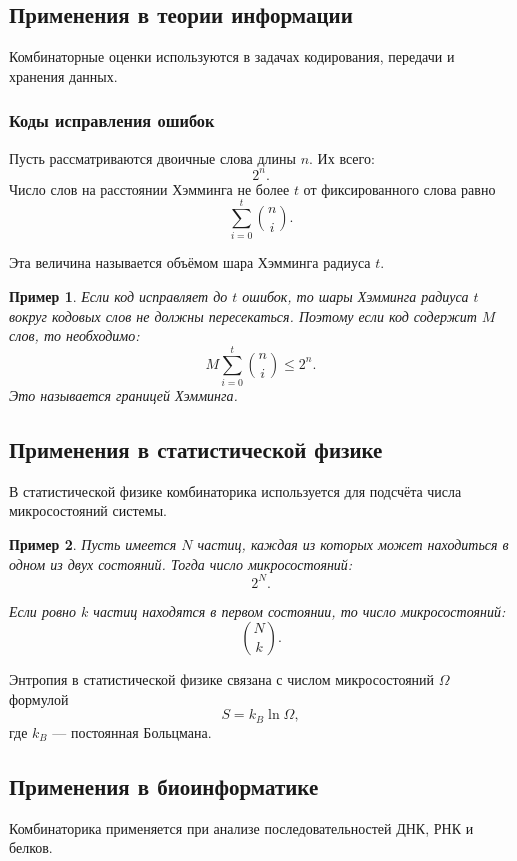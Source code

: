 \documentclass[12pt,a4paper]{article}
\newtheorem{example}{Пример}
\begin{document}
\subsection{Применения в теории информации}

Комбинаторные оценки используются в задачах кодирования, передачи и хранения данных.

\subsubsection{Коды исправления ошибок}

Пусть рассматриваются двоичные слова длины $n$. Их всего:
\[
2^n.
\]
Число слов на расстоянии Хэмминга не более $t$ от фиксированного слова равно
\[
\sum_{i=0}^{t}\binom{n}{i}.
\]

Эта величина называется объёмом шара Хэмминга радиуса $t$.

\begin{example}
Если код исправляет до $t$ ошибок, то шары Хэмминга радиуса $t$ вокруг кодовых слов не должны пересекаться. Поэтому если код содержит $M$ слов, то необходимо:
\[
M\sum_{i=0}^{t}\binom{n}{i}\le 2^n.
\]
Это называется границей Хэмминга.
\end{example}

\subsection{Применения в статистической физике}

В статистической физике комбинаторика используется для подсчёта числа микросостояний системы.

\begin{example}
Пусть имеется $N$ частиц, каждая из которых может находиться в одном из двух состояний. Тогда число микросостояний:
\[
2^N.
\]

Если ровно $k$ частиц находятся в первом состоянии, то число микросостояний:
\[
\binom{N}{k}.
\]
\end{example}

Энтропия в статистической физике связана с числом микросостояний $\Omega$ формулой
\[
S=k_B\ln \Omega,
\]
где $k_B$ --- постоянная Больцмана.

\subsection{Применения в биоинформатике}

Комбинаторика применяется при анализе последовательностей ДНК, РНК и белков.
\end{document}

